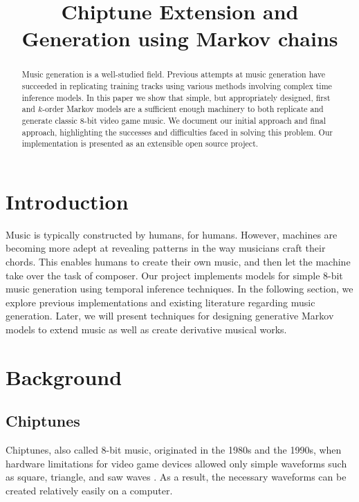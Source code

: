\documentclass{article}
\title{Chiptune Extension and Generation using Markov chains}
\begin{document}
\maketitle


\begin{abstract}
Music generation is a well-studied field. Previous attempts at music generation have succeeded in replicating training tracks using various methods involving complex 
time inference models. In this paper we show that simple, but appropriately designed, first and $k$-order Markov models are a sufficient enough machinery to both 
replicate and generate classic 8-bit video game music. We document our initial approach and final approach, highlighting the successes and difficulties faced in 
solving this problem. Our implementation is presented as an extensible open source project.
\end{abstract}

\section{Introduction}
Music is typically constructed by humans, for humans. However, machines are becoming more adept at revealing patterns in the way musicians craft their chords. 
This enables humans to create their own music, and then let the machine take over the task of composer. Our project implements models for simple 8-bit music 
generation using temporal inference techniques. In the following section, we explore previous implementations and existing literature regarding music generation. 
Later, we will present techniques for designing generative Markov models to extend music as well as create derivative musical works.

\section{Background}
\subsection{Chiptunes}
Chiptunes, also called 8-bit music, originated in the 1980s and the 1990s, when hardware limitations for video game devices allowed only simple waveforms such as 
square, triangle, and saw waves \cite{pop_chiptunes}.  As a result, the necessary waveforms can be created relatively easily on a computer. 
\end{document}
